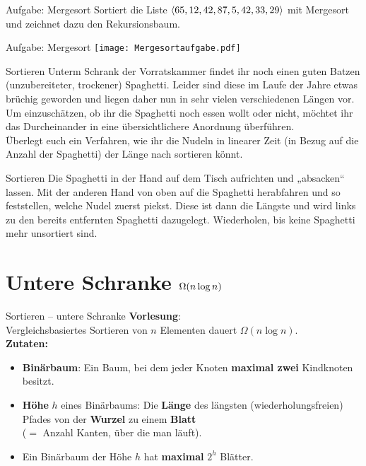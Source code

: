 \begin{frame}{Aufgabe: Mergesort}
	Sortiert die Liste $\langle 65,12,42,87,5,42,33,29 \rangle$ mit Mergesort und zeichnet dazu den Rekursionsbaum.
\end{frame}

\begin{frame}{Aufgabe: Mergesort}
	\solutionheading
	\medskip
	\centering
	\texttt{[image: Mergesortaufgabe.pdf]}
\end{frame}

\begin{frame}{Sortieren}
	Unterm Schrank der Vorratskammer findet ihr noch einen guten Batzen (unzubereiteter, trockener) Spaghetti. Leider sind diese im Laufe der Jahre etwas brüchig geworden und liegen daher nun in sehr vielen verschiedenen Längen vor. Um einzuschätzen, ob ihr die Spaghetti noch essen wollt oder nicht, möchtet ihr das Durcheinander in eine übersichtlichere Anordnung überführen. \\
	\medskip
	Überlegt euch ein Verfahren, wie ihr die Nudeln in linearer Zeit (in Bezug auf die Anzahl der Spaghetti) der Länge nach sortieren könnt.
\end{frame}

\begin{frame}{Sortieren}
	\solutionheading 
	Die Spaghetti in der Hand auf dem Tisch aufrichten und „absacken“ lassen. Mit der anderen Hand von oben auf die Spaghetti herabfahren und so feststellen, welche Nudel zuerst piekst. Diese ist dann die Längste und wird links zu den bereits entfernten Spaghetti dazugelegt. Wiederholen, bis keine Spaghetti mehr unsortiert sind.
\end{frame}

\section{Untere Schranke $\Omega\!\left(n \log n\right)$}

\begin{frame}[t]{Sortieren – untere Schranke}
	\textbf{Vorlesung}: \\
	\quad Vergleichsbasiertes Sortieren von $n$ Elementen dauert $\Omega(n \log n)$. \\
	\pause
	\bigskip
	\textbf{Zutaten:} 
	\begin{itemize}[<+->]
		\item \textbf{Binärbaum}: Ein Baum, bei dem jeder Knoten \textbf{maximal zwei} Kindknoten besitzt.
		\item \textbf{Höhe} $h$ eines Binärbaums: Die \textbf{Länge} des längsten (wiederholungsfreien) Pfades von der \textbf{Wurzel} zu einem \textbf{Blatt} \\ {\small ($=$ Anzahl Kanten, über die man läuft)}. 
		\item Ein Binärbaum der Höhe $h$ hat \textbf{maximal} $2^h$  Blätter.
	\end{itemize}	
\end{frame}

